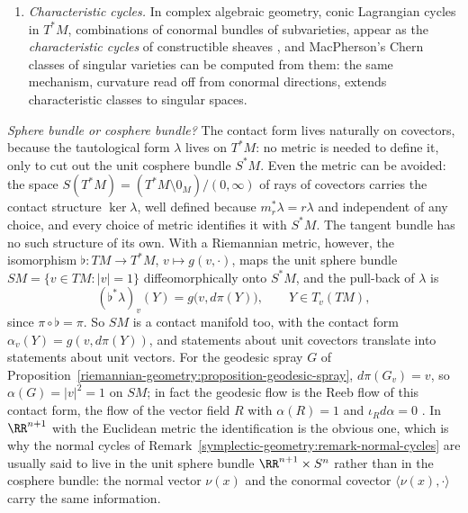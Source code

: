 \begin{remark}
\begin{enumerate}
$N(A \cup B) + N(A \cap B) = N(A) + N(B)$ when all four are defined, so the curvature integrals, the Euler characteristic among them, are additive functions of sets: this is the starting point of integral geometry.
\item \emph{Characteristic cycles.} In complex algebraic geometry, conic Lagrangian cycles in $T^*M$, combinations of conormal bundles of subvarieties, appear as the \emph{characteristic cycles} of constructible
sheaves \cite[Chapter IX]{ks-sheaves-manifolds}, and MacPherson's Chern classes of singular varieties \cite{macpherson-1974} can be computed from them: the same mechanism, curvature read off from conormal
directions, extends characteristic classes to singular spaces.
\end{enumerate}
\end{remark}

\begin{remark}\label{symplectic-geometry:remark-sphere-cosphere}
\emph{Sphere bundle or cosphere bundle?} The contact form lives naturally on covectors, because the tautological form $\lambda$ lives on $T^*M$: no metric is needed to define it, only to cut out the unit cosphere
bundle $S^*M$. Even the metric can be avoided: the space $S(T^*M) = (T^*M \setminus 0_M)/(0, \infty)$ of rays of covectors carries the contact structure $\ker\lambda$, well defined because $m_r^*\lambda = r\lambda$ and
independent of any choice, and every choice of metric identifies it with $S^*M$. The tangent bundle has no such structure of its own. With a Riemannian metric, however, the isomorphism
$\flat \colon TM \to T^*M$, $v \mapsto g(v, \cdot)$, maps the unit sphere bundle $SM = \{v \in TM : |v| = 1\}$ diffeomorphically onto $S^*M$, and the pull-back of $\lambda$ is
\[
(\flat^*\lambda)_v(Y) = g\bigl(v, d\pi(Y)\bigr), \qquad Y \in T_v(TM),
\]
since $\pi \circ \flat = \pi$. So $SM$ is a contact manifold too, with the contact form $\alpha_v(Y) = g(v, d\pi(Y))$, and statements about unit covectors translate into statements about unit vectors. For the
geodesic spray $G$ of Proposition~\ref{riemannian-geometry:proposition-geodesic-spray}, $d\pi(G_v) = v$, so $\alpha(G) = |v|^2 = 1$ on $SM$; in fact the geodesic flow is the Reeb flow of this contact form, the flow of
the vector field $R$ with $\alpha(R) = 1$ and $\iota_Rd\alpha = 0$ \cite{mcduff-salamon}. In $\RR^{n+1}$ with the Euclidean metric the identification is the obvious one, which is why the normal cycles of
Remark~\ref{symplectic-geometry:remark-normal-cycles} are usually said to live in the unit sphere bundle $\RR^{n+1} \times S^n$ rather than in the cosphere bundle: the normal vector $\nu(x)$ and the conormal covector
$\langle\nu(x), \cdot\rangle$ carry the same information.
\end{remark}


